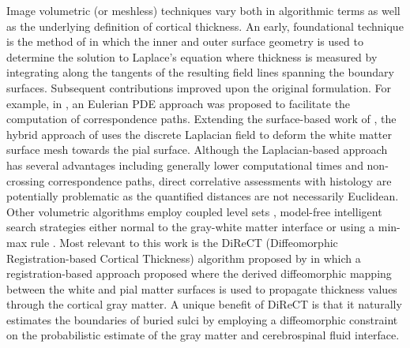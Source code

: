 Image volumetric (or meshless) techniques vary both in algorithmic terms as well as
the underlying definition of cortical thickness.  An early, foundational technique is the 
method of \cite{jones2000} in which the inner and outer surface geometry is used to determine the
solution to Laplace's equation where thickness is measured by integrating along the 
tangents of the resulting field lines spanning the boundary surfaces.  Subsequent contributions
improved upon the original formulation.  For example, in \cite{yezzi2003}, an Eulerian PDE approach
was proposed to facilitate the computation of correspondence paths.  Extending the surface-based
work of \cite{macdonald2000}, the hybrid approach of
\cite{kim2005} uses the discrete Laplacian field to deform the white matter surface mesh towards the 
pial surface.    Although the Laplacian-based approach has several advantages
including generally lower computational times and 
non-crossing correspondence paths, direct correlative assessments with histology
are potentially problematic as the quantified distances 
are not necessarily Euclidean.  Other volumetric algorithms employ coupled
level sets \citep{zeng1999}, model-free intelligent search strategies either normal to 
the gray-white matter interface \citep{scott2009} or using a min-max rule \citep{clement-vachet2011}.
Most relevant to this work is the DiReCT (Diffeomorphic Registration-based 
Cortical Thickness) algorithm proposed by \cite{das2009} in which 
a registration-based approach proposed where the derived diffeomorphic mapping between the 
white and pial matter surfaces is used to propagate thickness values 
through the cortical gray matter.  A unique benefit of DiReCT is that it
naturally estimates the boundaries of buried sulci by employing a
diffeomorphic constraint on the probabilistic estimate of the gray
matter and cerebrospinal fluid interface.  

